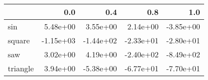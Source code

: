 \begin{tabular}{lrrrr}
\toprule
{} &       0.0 &       0.4 &       0.8 &       1.0 \\
\midrule
sin      &  5.48e+00 &  3.55e+00 &  2.14e+00 & -3.85e+00 \\
square   & -1.15e+03 & -1.44e+02 & -2.33e+01 & -2.80e+01 \\
saw      &  3.02e+00 &  4.19e+00 & -2.40e+02 & -8.49e+02 \\
triangle &  3.94e+00 & -5.38e+00 & -6.77e+01 & -7.70e+01 \\
\bottomrule
\end{tabular}
